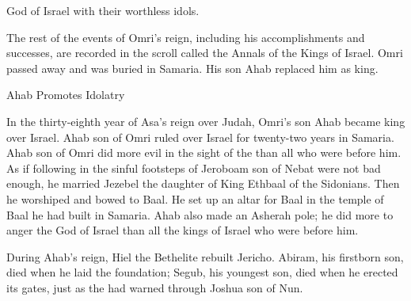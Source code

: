 {{}
God
of Israel
with their worthless idols.
\par }{\PP {}The rest
of the events
of Omri’s
reign, including
his accomplishments
and successes,
are recorded
in the scroll
called the Annals
of the Kings
of Israel.
Omri
passed away
and was buried
in Samaria.
His son
Ahab
replaced
him as king.
\par }{\SH Ahab Promotes Idolatry
\par }{\PP {}In the thirty-eighth
year
of Asa’s
reign over
Judah,
Omri’s
son
Ahab
became king
over
Israel.
Ahab
son
of Omri
ruled
over
Israel
for twenty-two
years
in Samaria.
Ahab
son
of Omri
did more evil
in the sight
of the
{}
than all
who
were before him.
As
if
following
in the sinful
footsteps of Jeroboam
son
of Nebat
were not bad enough, he married
Jezebel
the daughter
of King
Ethbaal
of the Sidonians.
Then
he worshiped
and bowed
to Baal.
He set
up an altar
for Baal
in the temple
of Baal
he had
built
in Samaria.
Ahab
also made
an Asherah pole;
he
did
more
to anger
the {}
God
of Israel
than all
the kings
of Israel
who
were
before him.
\par }{\PP {}During
Ahab’s reign, Hiel
the Bethelite
rebuilt
Jericho.
Abiram,
his firstborn son,
died when he laid
the foundation;
Segub,
his youngest
son, died when he erected its
gates,
just
as the
{}
had warned
through
Joshua
son
of Nun.

}
